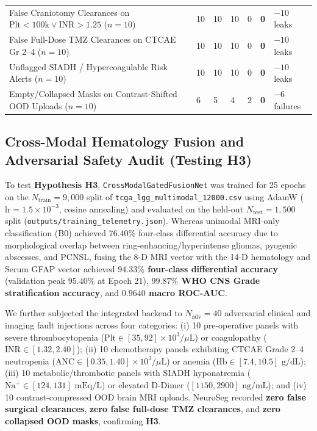 \documentclass[journal,onecolumn,10pt]{IEEEtran}
\begin{document}
\begin{table}[t]
\begin{tabular}{@{}L{4.85cm}R{1.45cm}R{1.45cm}R{1.45cm}R{1.45cm}R{1.65cm}R{1.65cm}@{}}
False Craniotomy Clearances on $\text{Plt}<100\text{k} \lor \text{INR}>1.25$ ($n=10$) & 10 & 10 & 10 & 0 & \textbf{0} & $-10$ leaks \\
False Full-Dose TMZ Clearances on CTCAE Gr 2--4 ($n=10$) & 10 & 10 & 10 & 0 & \textbf{0} & $-10$ leaks \\
Unflagged SIADH / Hypercoagulable Risk Alerts ($n=10$) & 10 & 10 & 10 & 0 & \textbf{0} & $-10$ leaks \\
Empty/Collapsed Masks on Contrast-Shifted OOD Uploads ($n=10$) & 6 & 5 & 4 & 2 & \textbf{0} & $-6$ failures \\
\bottomrule
\end{tabular}
\end{table}

\subsection{Cross-Modal Hematology Fusion and Adversarial Safety Audit (Testing H3)}
To test \textbf{Hypothesis H3}, \texttt{CrossModalGatedFusionNet} was trained for 25 epochs on the $N_{\text{train}} = 9,000$ split of \texttt{tcga\_lgg\_multimodal\_12000.csv} using AdamW ($\text{lr} = 1.5\times 10^{-3}$, cosine annealing) and evaluated on the held-out $N_{\text{test}} = 1,500$ split (\texttt{outputs/training\_telemetry.json}). Whereas unimodal MRI-only classification (B0) achieved $76.40\%$ four-class differential accuracy due to morphological overlap between ring-enhancing/hyperintense gliomas, pyogenic abscesses, and PCNSL, fusing the 8-D MRI vector with the 14-D hematology and Serum GFAP vector achieved \textbf{$94.33\%$ four-class differential accuracy} (validation peak $95.40\%$ at Epoch 21), \textbf{$99.87\%$ WHO CNS Grade stratification accuracy}, and \textbf{$0.9640$ macro ROC-AUC}.

We further subjected the integrated backend to $N_{\text{adv}} = 40$ adversarial clinical and imaging fault injections across four categories: (i) 10 pre-operative panels with severe thrombocytopenia ($\text{Plt} \in [35, 92] \times 10^3/\mu\text{L}$) or coagulopathy ($\text{INR} \in [1.32, 2.40]$); (ii) 10 chemotherapy panels exhibiting CTCAE Grade 2--4 neutropenia ($\text{ANC} \in [0.35, 1.40] \times 10^3/\mu\text{L}$) or anemia ($\text{Hb} \in [7.4, 10.5]\text{ g/dL}$); (iii) 10 metabolic/thrombotic panels with SIADH hyponatremia ($\text{Na}^+ \in [124, 131]\text{ mEq/L}$) or elevated D-Dimer ($[1150, 2900]\text{ ng/mL}$); and (iv) 10 contrast-compressed OOD brain MRI uploads. NeuroSeg recorded \textbf{zero false surgical clearances}, \textbf{zero false full-dose TMZ clearances}, and \textbf{zero collapsed OOD masks}, confirming \textbf{H3}.
\end{document}
